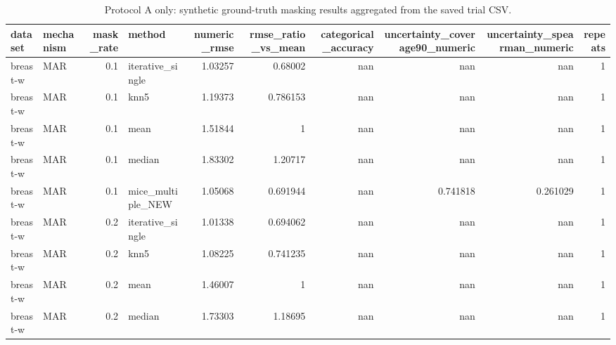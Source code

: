 \begin{table}[ht]
\centering
\caption{Protocol A only: synthetic ground-truth masking results aggregated from the saved trial CSV.}
\label{tab:protocol_a_ground_truth_summary}
\begin{tabular}{llrlrrrrrr}
\hline
 dataset         & mechanism   &   mask\_rate & method            &   numeric\_rmse &   rmse\_ratio\_vs\_mean &   categorical\_accuracy &   uncertainty\_coverage90\_numeric &   uncertainty\_spearman\_numeric &   repeats \\
\hline
 breast-w        & MAR         &         0.1 & iterative\_single  &       1.03257  &             0.68002  &            nan         &                       nan        &                    nan         &         1 \\
 breast-w        & MAR         &         0.1 & knn5              &       1.19373  &             0.786153 &            nan         &                       nan        &                    nan         &         1 \\
 breast-w        & MAR         &         0.1 & mean              &       1.51844  &             1        &            nan         &                       nan        &                    nan         &         1 \\
 breast-w        & MAR         &         0.1 & median            &       1.83302  &             1.20717  &            nan         &                       nan        &                    nan         &         1 \\
 breast-w        & MAR         &         0.1 & mice\_multiple\_NEW &       1.05068  &             0.691944 &            nan         &                         0.741818 &                      0.261029  &         1 \\
 breast-w        & MAR         &         0.2 & iterative\_single  &       1.01338  &             0.694062 &            nan         &                       nan        &                    nan         &         1 \\
 breast-w        & MAR         &         0.2 & knn5              &       1.08225  &             0.741235 &            nan         &                       nan        &                    nan         &         1 \\
 breast-w        & MAR         &         0.2 & mean              &       1.46007  &             1        &            nan         &                       nan        &                    nan         &         1 \\
 breast-w        & MAR         &         0.2 & median            &       1.73303  &             1.18695  &            nan         &                       nan        &                    nan         &         1 \\

\end{tabular}
\end{table}

